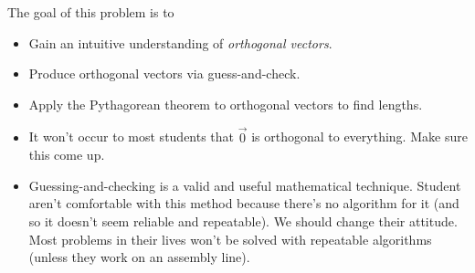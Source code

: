 \documentclass{problemset}
\newcommand{\bookonlynewpage}{\begin{bookonly}\newpage\end{bookonly}}
\begin{document}
	\bookonlynewpage

	\question
	\begin{annotation}
		\begin{goals}

			The goal of this problem is to
			\begin{itemize}
				\item Gain an intuitive understanding of \emph{orthogonal vectors}.
				\item Produce orthogonal vectors via guess-and-check.
				\item Apply the Pythagorean theorem to orthogonal vectors to find lengths.
			\end{itemize}
		\end{goals}

		\begin{notes}
			\begin{itemize}
				\item It won't occur to most students that $\vec 0$ is orthogonal to everything. Make sure
					this come up.
				\item Guessing-and-checking is a valid and useful mathematical technique. Student aren't
					comfortable with this method because there's no algorithm for it (and so it
					doesn't seem reliable and repeatable). We should change their attitude. Most problems
					in their lives won't be solved with repeatable algorithms (unless they work on
					an assembly line).
			\end{itemize}
		\end{notes}
	\end{annotation}
\end{document}

